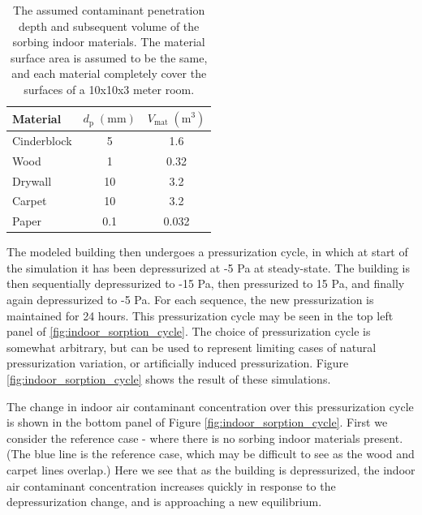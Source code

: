 \begin{table}[htb!]
  \centering
  \begin{tabular}{l c c}
    \toprule
    Material & $d_\mathrm{p} \; \mathrm{(mm)}$ & $V_\mathrm{mat} \; \mathrm{(m^3)}$ \\
    \hline
    Cinderblock & 5 & 1.6 \\
    Wood & 1 & 0.32 \\
    Drywall & 10 & 3.2 \\
    Carpet & 10 & 3.2 \\
    Paper & 0.1 & 0.032 \\
    \bottomrule
  \end{tabular}
  \caption{The assumed contaminant penetration depth and subsequent volume of the sorbing indoor materials. The material surface area is assumed to be the same, and each material completely cover the surfaces of a 10x10x3 meter room.}
  \label{tbl:sorbed_material}
\end{table}

The modeled building then undergoes a pressurization cycle, in which at start of the simulation it has been depressurized at -5 Pa at steady-state.
The building is then sequentially depressurized to -15 Pa, then pressurized to 15 Pa, and finally again depressurized to -5 Pa.
For each sequence, the new pressurization is maintained for 24 hours.
This pressurization cycle may be seen in the top left panel of \ref{fig:indoor_sorption_cycle}.
The choice of pressurization cycle is somewhat arbitrary, but can be used to represent limiting cases of natural pressurization variation, or artificially induced pressurization.
Figure \ref{fig:indoor_sorption_cycle} shows the result of these simulations.\par

The change in indoor air contaminant concentration over this pressurization cycle is shown in the bottom panel of Figure \ref{fig:indoor_sorption_cycle}.
First we consider the reference case - where there is no sorbing indoor materials present.
(The blue line is the reference case, which may be difficult to see as the wood and carpet lines overlap.)
Here we see that as the building is depressurized, the indoor air contaminant concentration increases quickly in response to the depressurization change, and is approaching a new equilibrium.\par

